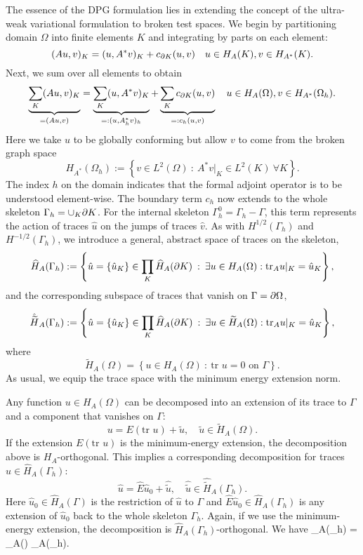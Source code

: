 The essence of the DPG formulation lies in extending the concept of the ultra-weak variational
formulation to broken test spaces. We begin by partitioning domain $\Omega$ into finite elements $K$
and integrating by parts on each element:
\[
(Au,v)_{K} = (u,A^\ast v)_{K} + c_{\ptl K}(u,v) \quad u \in H_A(K), v \in H_{A^\ast}(K).
\]
Next, we sum over all elements to obtain
\[
\underbrace{\sum_K (Au,v)_{K}}_{ = (Au,v)}
 = \underbrace{\sum_K (u,A^\ast v)_{K}}_{=: (u,A_h^\ast v)_{h}}
 + \underbrace{\sum_K c_{\ptl K}(u,v)}_{=: c_h(u,v)}
 \quad u \in H_A(\Omega), v \in H_{A^\ast}(\Omega_h).
\]
Here we take $u$ to be globally conforming but allow $v$ to come from the broken graph space
\[
H_{A^\ast}(\Omega_h) := \left\{ v \in L^2(\Omega) \: : \: A^\ast v\vert_K \in L^2(K) \: \forall K\right\}.
\]
The index $h$ on the domain
indicates that the formal adjoint operator is to be
understood element-wise. The boundary term $c_{h}$ now extends to the whole skeleton $\Gamma_h = \cup_K \ptl K$.
For the internal skeleton $\Gamma_h^0 = \Gamma_h - \Gamma$, this term represents the action of traces $\hat{u}$
on the jumps of traces $\hat{v}$. As with $H^{1/2}(\Gamma_h)$ and $H^{-1/2}(\Gamma_h)$,
we introduce a general, abstract space of traces on the skeleton,
\[
\widehat{H}_A(\Gamma_h) := \left\{
\hat{u} = \{ \hat{u}_K \} \in \prod_K \widehat{H}_A(\ptl K) \: : \: \exists u \in H_A(\Omega) : 
\text{tr}_A u\vert_K =  \hat{u}_K \right\},
\]
and the corresponding subspace of traces that vanish on $\Gamma = \ptl \Omega$,
\[
\hat{\tilde{H}}_A(\Gamma_h) := \left\{
\hat{u} = \{ \hat{u}_K \} \in \prod_K \widehat{H}_A(\ptl K) \: : \: \exists u \in \tilde{H}_A(\Omega)
 : 
\text{tr}_A u\vert_K =  \hat{u}_K \right\},
\]
where
\[
\tilde{H}_A(\Omega) = \left\{ u \in H_A(\Omega) \: : \: \text{tr }u = 0 \text{ on } \Gamma \right\}.
\]
As usual, we equip the trace space with the minimum energy extension norm.

Any function $u \in H_A(\Omega)$ can be decomposed into an extension of its trace to $\Gamma$
and a component that vanishes on $\Gamma$:
\[
u = E(\text{tr } u ) + \tilde{u},\quad \tilde{u} \in \tilde{H}_A(\Omega).
\]
If the extension $E(\text{tr } u )$ is the minimum-energy extension, the decomposition above
is $H_A$-orthogonal. This implies a corresponding decomposition for traces $\hat{u}
\in \widehat{H}_A(\Gamma_h)$:
\[
\hat{u} = 
{\hat{E}}\hat{u}_0 + \hat{\tilde{u}},\quad \hat{\tilde{u}} \in \hat{\tilde{H}}_A(\Gamma_h).
\]
Here {
$\hat{u}_0 \in \widehat{H}_A(\Gamma)$ is the restriction of $\hat{u}$ to $\Gamma$ and  
$\hat{E}\hat{u}_0 \in \widehat{H}_A(\Gamma_h)$ is any extension of $\hat{u}_0$ back to the whole
skeleton $\Gamma_h$.}
Again, if we use the minimum-energy extension, the decomposition
is $\widehat{H}_A(\Gamma_h)$-orthogonal. We have
\be
{}_A(\Gamma_h) = {} _A(\Gamma) \oplus {}_A(\Gamma_h).
\label{eq:trace_decomposition}
\ee








